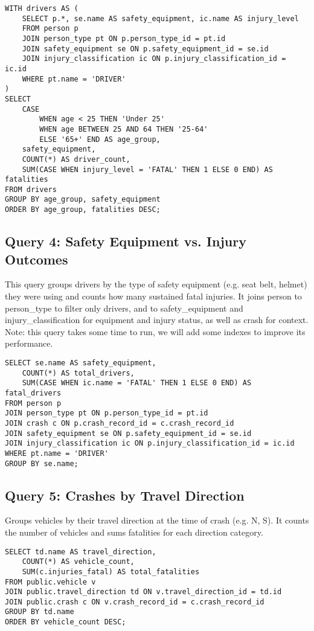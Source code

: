 \documentclass[12pt]{article}
\begin{document}
{\scriptsize
\begin{verbatim}
WITH drivers AS (
    SELECT p.*, se.name AS safety_equipment, ic.name AS injury_level
    FROM person p
    JOIN person_type pt ON p.person_type_id = pt.id
    JOIN safety_equipment se ON p.safety_equipment_id = se.id
    JOIN injury_classification ic ON p.injury_classification_id = ic.id
    WHERE pt.name = 'DRIVER'
)
SELECT
    CASE
        WHEN age < 25 THEN 'Under 25'
        WHEN age BETWEEN 25 AND 64 THEN '25-64'
        ELSE '65+' END AS age_group,
    safety_equipment,
    COUNT(*) AS driver_count,
    SUM(CASE WHEN injury_level = 'FATAL' THEN 1 ELSE 0 END) AS fatalities
FROM drivers
GROUP BY age_group, safety_equipment
ORDER BY age_group, fatalities DESC;
\end{verbatim}}


\subsection{Query 4: Safety Equipment vs. Injury Outcomes}

This query groups drivers by the type of safety equipment (e.g. seat belt, helmet) they were using and counts how many sustained fatal injuries. It joins person to person\_type to filter only drivers, and to safety\_equipment and injury\_classification for equipment and injury status, as well as crash for context. Note: this query takes some time to run, we will add some indexes to improve its performance.

{\scriptsize
\begin{verbatim}
SELECT se.name AS safety_equipment,
    COUNT(*) AS total_drivers,
    SUM(CASE WHEN ic.name = 'FATAL' THEN 1 ELSE 0 END) AS fatal_drivers
FROM person p
JOIN person_type pt ON p.person_type_id = pt.id
JOIN crash c ON p.crash_record_id = c.crash_record_id
JOIN safety_equipment se ON p.safety_equipment_id = se.id
JOIN injury_classification ic ON p.injury_classification_id = ic.id
WHERE pt.name = 'DRIVER'
GROUP BY se.name;
\end{verbatim}}

\subsection{Query 5: Crashes by Travel Direction}

Groups vehicles by their travel direction at the time of crash (e.g. N, S). It counts the number of vehicles and sums fatalities for each direction category. 

{\scriptsize
\begin{verbatim}
SELECT td.name AS travel_direction, 
    COUNT(*) AS vehicle_count, 
    SUM(c.injuries_fatal) AS total_fatalities
FROM public.vehicle v
JOIN public.travel_direction td ON v.travel_direction_id = td.id
JOIN public.crash c ON v.crash_record_id = c.crash_record_id
GROUP BY td.name
ORDER BY vehicle_count DESC;
\end{verbatim}}
\end{document}
